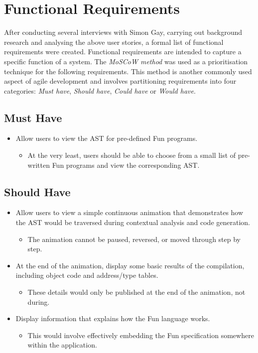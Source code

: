 \documentclass{l4proj}
\begin{document}
\section{Functional Requirements}
After conducting several interviews with Simon Gay, carrying out background research and analysing the above user stories, a formal list of functional requirements were created. Functional requirements are intended to capture a specific function of a system. The \textit {MoSCoW method} was used as a prioritisation technique for the following requirements. This method is another commonly used aspect of agile development and involves partitioning requirements into four categories: \textit{Must have}, \textit{Should have}, \textit{Could have} or \textit{Would have}.
\subsection{Must Have}
\begin{itemize}
\item Allow users to view the AST for pre-defined Fun programs.
\begin{itemize}
\item At the very least, users should be able to choose from a small list of pre-written Fun programs and view the corresponding AST.
\end{itemize}
\end{itemize}
\subsection{Should Have}
\begin{itemize}
\item Allow users to view a simple continuous animation that demonstrates how the AST would be traversed during contextual analysis and code generation.
\begin{itemize}
\item The animation cannot be paused, reversed, or moved through step by step.
\end{itemize}
\item At the end of the animation, display some basic results of the compilation, including object code and address/type tables.
\begin{itemize}
\item These details would only be published at the end of the animation, not during.
\end{itemize}
\item Display information that explains how the Fun language works.
\begin{itemize}
\item This would involve effectively embedding the Fun specification somewhere within the application.
\end{itemize}
\end{itemize}
\end{document}
